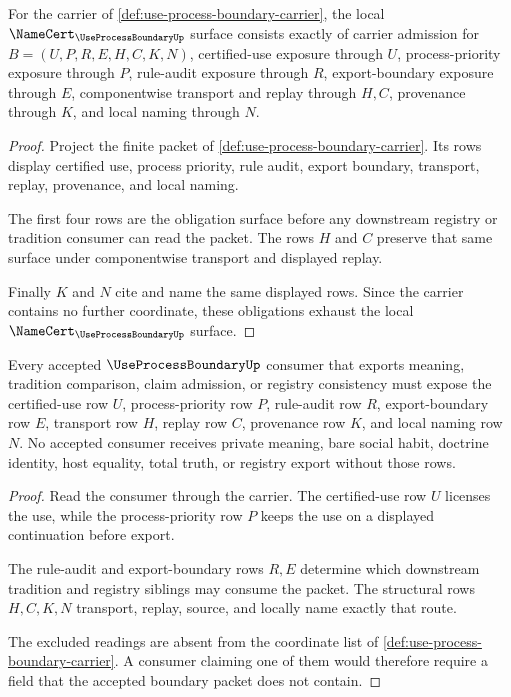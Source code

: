 \begin{theorem}
\label{thm:use-process-boundary-namecert-obligations}
For the carrier of \autoref{def:use-process-boundary-carrier}, the local $\NameCert_{\UseProcessBoundaryUp}$ surface consists exactly of carrier admission for $B=(U,P,R,E,H,C,K,N)$, certified-use exposure through $U$, process-priority exposure through $P$, rule-audit exposure through $R$, export-boundary exposure through $E$, componentwise transport and replay through $H,C$, provenance through $K$, and local naming through $N$.
\end{theorem}
\begin{proof}
Project the finite packet of \autoref{def:use-process-boundary-carrier}. Its rows display certified use, process priority, rule audit, export boundary, transport, replay, provenance, and local naming.

The first four rows are the obligation surface before any downstream registry or tradition consumer can read the packet. The rows $H$ and $C$ preserve that same surface under componentwise transport and displayed replay.

Finally $K$ and $N$ cite and name the same displayed rows. Since the carrier contains no further coordinate, these obligations exhaust the local $\NameCert_{\UseProcessBoundaryUp}$ surface.
\end{proof}

\begin{theorem}
\label{thm:use-process-boundary-certified-use-nonescape}
Every accepted $\UseProcessBoundaryUp$ consumer that exports meaning, tradition comparison, claim admission, or registry consistency must expose the certified-use row $U$, process-priority row $P$, rule-audit row $R$, export-boundary row $E$, transport row $H$, replay row $C$, provenance row $K$, and local naming row $N$. No accepted consumer receives private meaning, bare social habit, doctrine identity, host equality, total truth, or registry export without those rows.
\end{theorem}
\begin{proof}
Read the consumer through the carrier. The certified-use row $U$ licenses the use, while the process-priority row $P$ keeps the use on a displayed continuation before export.

The rule-audit and export-boundary rows $R,E$ determine which downstream tradition and registry siblings may consume the packet. The structural rows $H,C,K,N$ transport, replay, source, and locally name exactly that route.

The excluded readings are absent from the coordinate list of \autoref{def:use-process-boundary-carrier}. A consumer claiming one of them would therefore require a field that the accepted boundary packet does not contain.
\end{proof}

